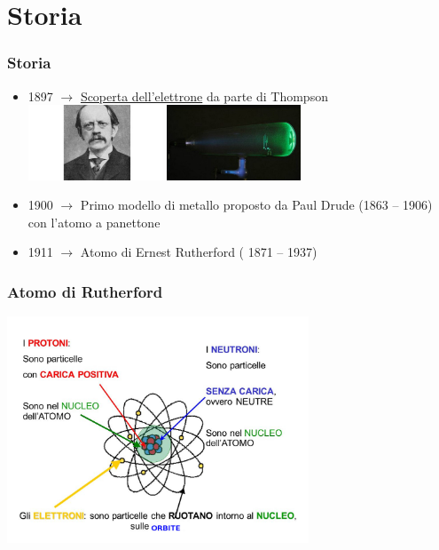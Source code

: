 \section{Storia} %
	\label{sec:storia}
	
	\begin{frame}[t]\frametitle{Storia}
		\begin{itemize}
			\item 1897 $\longrightarrow$ \href{http://www.wired.it/scienza/energia/2014/04/30/la-scoperta-dellelettrone/}{Scoperta dell'elettrone} da parte di Thompson 
			\includegraphics[width=4cm]{./img/thompson.jpg}
			\includegraphics[width=4cm]{./img/tubo.jpg}
			\pause
			\item 1900  $\longrightarrow$ Primo modello di metallo proposto da Paul Drude (1863 – 1906) con l'atomo a panettone
			\pause
			\item 1911  $\longrightarrow$ Atomo di Ernest Rutherford ( 1871 – 1937)
		\end{itemize}
	\end{frame}

	\begin{frame}[c]\frametitle{Atomo di Rutherford}
	    
		\centering \includegraphics[width=9cm]{./img/atomo.jpg}

	\end{frame}

